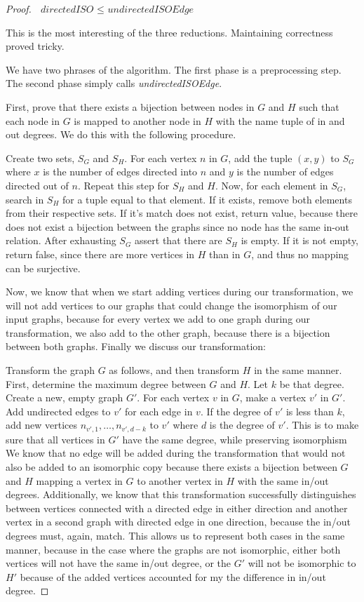 \documentclass[12pt]{article}
\begin{document}
\begin{proof}{$\textit{ directedISO } \leq \textit{ undirectedISOEdge}$}

This is the most interesting of the three reductions. Maintaining correctness proved tricky.

We have two phrases of the algorithm. The first phase is a preprocessing step. The second phase simply calls \textit{undirectedISOEdge}.

First, prove that there exists a bijection between nodes in $G$ and $H$ such that each node in $G$ is mapped to another node in $H$ with the name tuple of in and out degrees. We do this with the following procedure.

Create two sets, $S_{G}$ and $S_{H}$. For each vertex $n$ in $G$, add the tuple $(x, y)$ to $S_{G}$ where $x$ is the number of edges directed into $n$ and $y$ is the number of edges directed out of $n$. Repeat this step for $S_{H}$ and $H$. Now, for each element in $S_{G}$, search in $S_{H}$ for a tuple equal to that element. If it exists, remove both elements from their respective sets. If it's match does not exist, return value, because there does not exist a bijection between the graphs since no node has the same in-out relation. After exhausting $S_{G}$ assert that there are $S_{H}$ is empty. If it is not empty, return false, since there are more vertices in $H$ than in $G$, and thus no mapping can be surjective.

Now, we know that when we start adding vertices during our transformation, we will not add vertices to our graphs that could change the isomorphism of our input graphs, because for every vertex we add to one graph during our transformation, we also add to the other graph, because there is a bijection between both graphs. Finally we discuss our transformation:

Transform the graph $G$ as follows, and then transform $H$ in the same manner.
First, determine the maximum degree between $G$ and $H$. Let $k$ be that degree. Create a new, empty graph $G'$. For each vertex $v$ in $G$, make a vertex $v'$ in $G'$. Add undirected edges to $v'$ for each edge in $v$. If the degree of $v'$ is less than $k$, add new vertices $n_{v', 1}, \dots, n_{v', d-k}$ to $v'$ where $d$ is the degree of $v'$. This is to make sure that all vertices in $G'$ have the same degree, while preserving isomorphism We know that no edge will be added during the transformation that would not also be added to an isomorphic copy because there exists a bijection between $G$ and $H$ mapping a vertex in $G$ to another vertex in $H$ with the same in/out degrees. Additionally, we know that this transformation successfully distinguishes between vertices connected with a directed edge in either direction and another vertex in a second graph with directed edge in one direction, because the in/out degrees must, again, match. This allows us to represent both cases in the same manner, because in the case where the graphs are not isomorphic, either both vertices will not have the same in/out degree, or the $G'$ will not be isomorphic to $H'$ because of the added vertices accounted for my the difference in in/out degree.


\end{proof}
\end{document}
